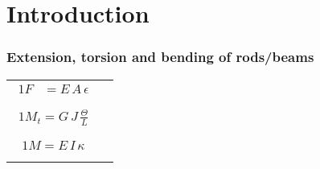 \section*{Introduction}


\begin{frame}
  \frametitle{Extension, torsion and bending of rods/beams}
  
  \begin{tabularx}{\linewidth}{XX}
    {
    \begin{alignat*}{1}
      F &= E \, A \, \epsilon \\
    \end{alignat*}
    } & {
    \null
    } \\
    
    {
    \begin{alignat*}{1}
      M_t = G \, J \, \frac{\Theta}{L} \\
    \end{alignat*}
    } & {
    \null
    } \\
        
    {
    \begin{alignat*}{1}
      M = E \, I \, \kappa \\
    \end{alignat*}
    } & {
    \null
    }
  \end{tabularx}
\end{frame}


